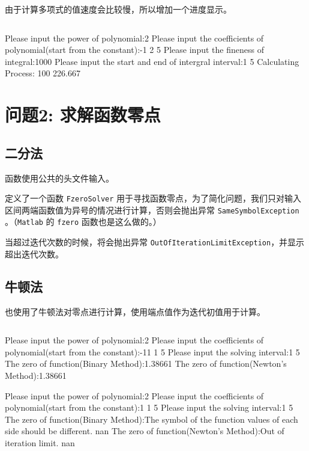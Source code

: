 \documentclass[12pt,a4paper]{article}
\begin{document}
由于计算多项式的值速度会比较慢，所以增加一个进度显示。

\inputminted[]{cpp}{code/Romberg.cpp}
% 

\begin{literal}
Please input the power of polynomial:2
Please input the coefficients of polynomial(start from the constant):-1 2 5
Please input the fineness of integral:1000
Please input the start and end of intergral interval:1 5
Calculating Process: 100%
226.667
\end{literal}

\section{问题2: 求解函数零点}

\subsection{二分法}

函数使用公共的头文件输入。

定义了一个函数 \texttt{FzeroSolver} 用于寻找函数零点，为了简化问题，我们只对输入区间两端函数值为异号的情况进行计算，否则会抛出异常 \texttt{SameSymbolException} 。（\texttt{Matlab} 的 \texttt{fzero} 函数也是这么做的。）

当超过迭代次数的时候，将会抛出异常 \texttt{OutOfIterationLimitException}，并显示超出迭代次数。

\subsection{牛顿法}

也使用了牛顿法对零点进行计算，使用端点值作为迭代初值用于计算。

% 
\inputminted[]{cpp}{code/fzero.cpp}

\begin{literal}
Please input the power of polynomial:2
Please input the coefficients of polynomial(start from the constant):-11 1 5
Please input the solving interval:1 5
The zero of function(Binary Method):1.38661
The zero of function(Newton's Method):1.38661
\end{literal}

\begin{literal}
Please input the power of polynomial:2
Please input the coefficients of polynomial(start from the constant):1 1 5
Please input the solving interval:1 5
The zero of function(Binary Method):The symbol of the function values of each side should be different.
nan
The zero of function(Newton's Method):Out of iteration limit.
nan
\end{literal}

\end{document}
